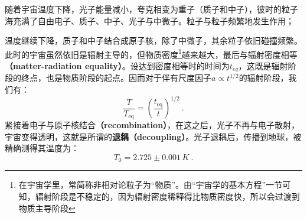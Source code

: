 随着宇宙温度下降，光子能量减小，夸克相变为重子（质子和中子），彼时的粒子海充满了自由电子、质子、中子、光子与中微子。粒子与粒子频繁地发生作用；

温度继续下降，质子和中子结合成原子核，除了中微子，其余粒子依旧碰撞频繁。此时的宇宙虽然依旧是辐射主导的，但物质密度\footnote{在宇宙学里，常简称非相对论粒子为“物质”。由“宇宙学的基本方程”一节可知，辐射阶段是不稳定的，因为辐射密度稀释得比物质密度快，所以会过渡到物质主导阶段}越来越大，最后与辐射密度相等\textbf{（matter-radiation equality）}。设达到密度相等时的时间为$t_{eq}$，这既是辐射阶段的终点，也是物质阶段的起点。因而对于伴有尺度因子$a\propto t^{1/2}$的辐射阶段，我们有：
\begin{equation}
\frac T{T_\mathrm{eq}}=\left(\frac{t_\mathrm{eq}}t\right)^{1/2}~.
\end{equation}
紧接着电子与原子核结合\textbf{（recombination）}，在这之后，光子不再与电子散射，宇宙变得透明，这就是所谓的\textbf{退耦（decoupling）}。光子退耦后，传播到地球，被精确测得其温度为：
\begin{equation}
T_{0}=2.725 \pm 0.001 \,K~.
\end{equation}

